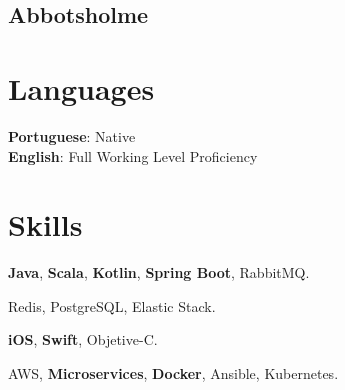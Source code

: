 \documentclass[letterpaper]{deedy-resume} %
\begin{document}
\begin{minipage}[t]{0.33\textwidth}
\sectionspace %

\subsection{Abbotsholme}

\sectionspace %


\section{Languages} 
\textbf{Portuguese}: Native\\
\textbf{English}: Full Working Level Proficiency\\
\sectionspace %


\section{Skills}

\textbf{Java}, \textbf{Scala}, \textbf{Kotlin}, \textbf{Spring Boot}, RabbitMQ.

\vspace{2mm}
Redis, PostgreSQL, Elastic Stack.

\vspace{2mm}
\textbf{iOS}, \textbf{Swift}, Objetive-C.

\vspace{2mm}
AWS, \textbf{Microservices}, \textbf{Docker}, Ansible, Kubernetes.


\sectionspace %

\end{minipage} %
\hfill
%
\end{document}

